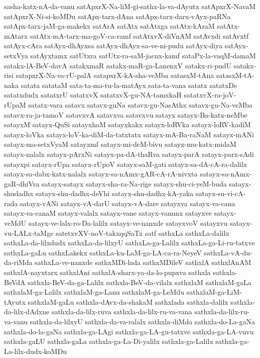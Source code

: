 {sasha-katx-nA-da-vanu
satApxrX-Na-liM-gi-sathx-la-va-dAyutx
satApxrX-NavaM
satApxrX-Ni-si-koMDu
satApx-tarx-dAna
satApx-tarx-darx-vAyx-paRNa
satApx-tarx-jaM-ga-makekx
satArA
satAtx
satAtxga
satAtx-kAraM
satAtx-mAtarx
satAtx-mA-tarx-ma-goV-ca-ramf
satAtxvX-diVnAM
satAvxdi
satAvxtf
satAyx-cAra
satAyx-dhAyxsa
satAyx-dhAyx-sa-ve-ni-pudu
satAyx-diya
satAyx-setxVya
satAyxtamx
satUtxra
satUtx-ra-saM-jacnx-kamf
sataPx-la-vaqM-damaM
satakx-lA-BeV-davA
satakxmaR
satakx-maR-ga-LanenxV
satakx-ri-pudU
satakx-risi
satapxrX-Na-va-rU-palA
satapxrX-kA-sha-veMba
satasxM-tAna
satasxM-tA-naka
satata
satataM
sata-ta-ma-tu-la-matAyx
sata-ta-vana
satatx
satatxDe
satatxdudx
satatxrU
satatxvX
satatxvX-gu-NA-tamxkaH
satatxvX-ra-joV-rUpaM
satatx-vara
satavx
satavx-guNa
satavx-gu-NasAthx
satavx-gu-Na-veMba
satavx-ra-ja-tamoV
satavxvA
satavxva
satavxvu
satayx
satayx-Ba-katx-neMbe
satayxM
satayx-QuSi
satayxhaM
satayxkakx
satayx-loRVka
satayx-loRV-kadiM
satayx-loVka
satayx-loV-ka-diM-da-tatxtatx
satayx-mA-Ba-raNaM
satayx-mANi
satayx-ma-setxVyaM
satayxmf
satayx-mi-deM-bivu
satayx-mu-katx-midaM
satayx-nalalx
satayx-pArxNi
satayx-pa-dA-thaRva
satayx-parA
satayx-parx-sAdi
satayxpi
satayx-rUpa
satayx-rUpoV
satayx-saM-gati
satayx-sa-dA-cA-ra-dalilx
satayx-sa-dabx-katx-nalalx
satayx-sa-nAmx-gAR-cA-rA-nivxta
satayx-sa-nAmx-gaR-dhiVra
satayx-satayx
satayx-sha-ra-Na-rige
satayx-shu-ci-yeM-buda
satayx-shudadhx
satayx-shu-dadhx-deVhi
satayx-shu-dadhx-kA-yaka
satayx-su-vi-cA-rada
satayx-vANi
satayx-vA-darU
satayx-vA-dare
satayxva
satayx-va-cana
satayx-va-canaM
satayx-valalx
satayx-vane
satayx-vanunx
satayxve
satayx-veMdU
satayx-ve-lalx-ro-Da-lalilx
satayx-ve-nanxde
satayxvoV
satayxvu
satayx-vu-LALx-taMge
satetxvXV-noV-takxqqSaTx
satf
sathxLa
sathxLa-dalilx
sathxLa-da-lilxdudx
sathxLa-da-lilxyU
sathxLa-ga-Lalilx
sathxLa-ga-Li-ru-tatxve
sathxLa-gaLu
sathxLakekx
sathxLa-ku-LaM-ga-LA-ca-ra-NeyeV
sathxLa-vA-du-da-riMda
sathxLa-ve-nanxde
sathxMDi-lada
sathxMDileV
sathxlA
sathxlAnAM
sathxlA-nayxtarx
sathxlAni
sathxlA-sharx-ya-da-lo-pupxva
sathxla
sathxla-BeVdA
sathxla-BeV-da-ga-Lalilx
sathxla-BeV-da-vilalx
sathxlaM
sathxlaM-gaLa
sathxlaM-ga-Lalilx
sathxlaM-ga-Lanu
sathxlaM-ga-LeMdu
sathxlaM-ga-LiM-tAyutx
sathxlaM-gaLu
sathxla-dAvx-da-shakaM
sathxlada
sathxla-dalilx
sathxla-da-lilx-dAdxne
sathxla-da-lilx-ruva
sathxla-da-lilx-ru-va-vana
sathxla-da-lilx-ru-va-vanu
sathxla-da-lilxyU
sathxla-da-va-ralalx
sathxla-diMda
sathxla-do-La-gaNa
sathxla-do-la-gaNa
sathxla-ga-LAgi
sathxla-ga-LA-gu-tatxve
sathxla-ga-LA-vuvu
sathxla-gaLU
sathxla-gaLa
sathxla-ga-La-Di-yalilx
sathxla-ga-Lalilx
sathxla-ga-La-lilx-dudx-koMDu
}
